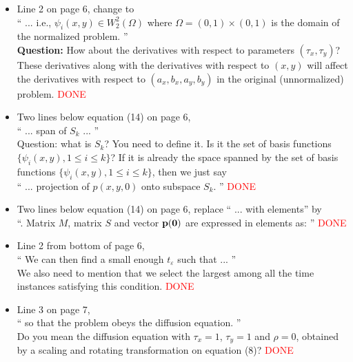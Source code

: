 \documentclass[12pt]{article}
\begin{document}
\begin{itemize}
\item Line 2 on page 6, change to \\
`` ... i.e., $\psi_i(x, y) \in W_2^2(\Omega) $ where $\Omega = (0, 1) \times (0, 1)$ is 
the domain of the normalized problem. '' \\
{\bf Question:} How about the derivatives with respect to parameters 
$(\tau_x, \tau_y)$? These derivatives along with the derivatives with respect to $(x, y)$
will affect the derivatives with respect to $(a_x, b_x, a_y, b_y)$ in the original 
(unnormalized) problem. \textcolor{red}{DONE}

\item Two lines below equation (14) on page 6, \\
`` ... span of $S_k$ ... '' \\
Question: what is $S_k$? You need to define it. 
Is it the set of basis functions $\{\psi_i(x, y), 1 \le i \le k \}$? 
If it is already the space spanned by the set of basis functions 
$\{\psi_i(x, y), 1 \le i \le k \}$, then we just say \\
`` ... projection of $p(x, y, 0)$ onto subspace $S_k$. '' \textcolor{red}{DONE}

\item Two lines below equation (14) on page 6, replace `` ... with elements'' by \\
  ``. Matrix $M$, matrix $S$ and vector $\bf{p}(0)$ are expressed in elements as: ''
  \textcolor{red}{DONE}

\item Line 2 from bottom of page 6, \\
  `` We can then find a small enough $t_{\varepsilon}$ such that ... '' \\
  We also need to mention that we select the largest among all the
  time instances satisfying this condition.  \textcolor{red}{DONE}

\item Line 3 on page 7, \\
  `` so that the problem obeys the diffusion equation. '' \\
  Do you mean the diffusion equation with $\tau_x=1$, $\tau_y=1$ and
  $\rho=0$, obtained by a scaling and rotating transformation on
  equation (8)? \textcolor{red}{DONE}


\end{itemize}
\end{document}
